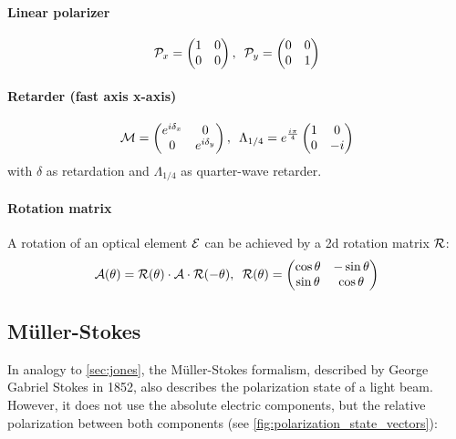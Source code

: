 \paragraph{Linear polarizer}
\begin{align}
\mathcal{P}_x =
\begin{pmatrix}
1 & 0 \\ 0 & 0
\end{pmatrix}
, \enspace
\mathcal{P}_y =
\begin{pmatrix}
0 & 0 \\ 0 & 1
\end{pmatrix}
\end{align}
% 
\paragraph{Retarder (fast axis x-axis)}
\begin{align}
\mat{M} =
\begin{pmatrix}
e^{i \delta_x} & 0 \\ 0 & e^{i \delta_y}
\end{pmatrix}
, \enspace
% 
\Lambda_{1/4}=
e^{\frac{i \pi}{4}}
\begin{pmatrix}
1 & 0 \\ 0 & -i
\end{pmatrix}
\end{align}
% 
with $\delta$ as retardation and $\Lambda_{1/4}$ as quarter-wave retarder.
%
\paragraph{Rotation matrix}
A rotation of an optical element $\mathcal{E}$ can be achieved by a 2d rotation matrix $\mathcal{R}$:
\begin{align}
\begin{split}\label{eq::JonesRotation}
\mathcal{A}(\theta )=\mathcal{R}(\theta )\cdot\mathcal{A}\cdot\mathcal{R}(-\theta )
, \enspace
\mathcal{R}(\theta ) =
\begin{pmatrix}
\cos \theta & -\sin \theta \\
\sin \theta & \cos \theta
\end{pmatrix}
\end{split}
\end{align}
% 
%
%
\subsection{M{\"u}ller-Stokes}\label{sec:MuellerStokes}
%
In analogy to \cref{sec:jones}, the M{\"u}ller-Stokes formalism, described by George Gabriel Stokes in 1852, also describes the polarization state of a light beam.
However, it does not use the absolute electric components, but the relative polarization between both components (see \cref{fig:polarization_state_vectors}):
%
